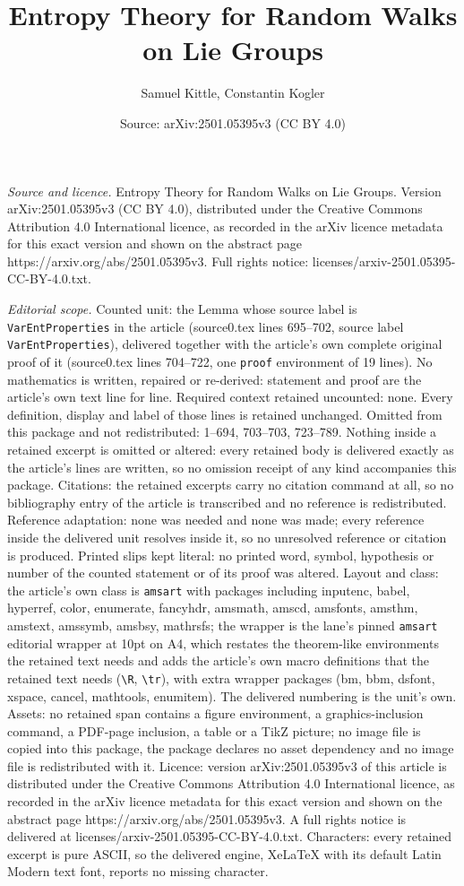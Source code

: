 \documentclass[10pt,a4paper]{amsart}
\title[Entropy Theory for Random Walks on Lie Groups]{Entropy Theory for Random Walks on Lie Groups}
\author{Samuel Kittle, Constantin Kogler}
\date{Source: arXiv:2501.05395v3 (CC BY 4.0)}
\begin{document}
\maketitle

\noindent\emph{Source and licence.} Entropy Theory for Random Walks on Lie Groups. Version arXiv:2501.05395v3 (CC BY 4.0), distributed under the Creative Commons Attribution 4.0 International licence, as recorded in the arXiv licence metadata for this exact version and shown on the abstract page https://arxiv.org/abs/2501.05395v3. Full rights notice: licenses/arxiv-2501.05395-CC-BY-4.0.txt.\par\smallskip

\noindent\textit{Editorial scope.} Counted unit: the Lemma whose source label is \texttt{VarEntProperties} in the article (source0.tex lines 695--702, source label \texttt{VarEntProperties}), delivered together with the article's own complete original proof of it (source0.tex lines 704--722, one \texttt{proof} environment of 19 lines). No mathematics is written, repaired or re-derived: statement and proof are the article's own text line for line. Required context retained uncounted: none. Every definition, display and label of those lines is retained unchanged. Omitted from this package and not redistributed: 1--694, 703--703, 723--789. Nothing inside a retained excerpt is omitted or altered: every retained body is delivered exactly as the article's lines are written, so no omission receipt of any kind accompanies this package. Citations: the retained excerpts carry no citation command at all, so no bibliography entry of the article is transcribed and no reference is redistributed. Reference adaptation: none was needed and none was made; every reference inside the delivered unit resolves inside it, so no unresolved reference or citation is produced. Printed slips kept literal: no printed word, symbol, hypothesis or number of the counted statement or of its proof was altered. Layout and class: the article's own class is \texttt{amsart} with packages including inputenc, babel, hyperref, color, enumerate, fancyhdr, amsmath, amscd, amsfonts, amsthm, amstext, amssymb, amsbsy, mathrsfs; the wrapper is the lane's pinned \texttt{amsart} editorial wrapper at 10pt on A4, which restates the theorem-like environments the retained text needs and adds the article's own macro definitions that the retained text needs (\texttt{\textbackslash R}, \texttt{\textbackslash tr}), with extra wrapper packages (bm, bbm, dsfont, xspace, cancel, mathtools, enumitem). The delivered numbering is the unit's own. Assets: no retained span contains a figure environment, a graphics-inclusion command, a PDF-page inclusion, a table or a TikZ picture; no image file is copied into this package, the package declares no asset dependency and no image file is redistributed with it. Licence: version arXiv:2501.05395v3 of this article is distributed under the Creative Commons Attribution 4.0 International licence, as recorded in the arXiv licence metadata for this exact version and shown on the abstract page https://arxiv.org/abs/2501.05395v3. A full rights notice is delivered at licenses/arxiv-2501.05395-CC-BY-4.0.txt. Characters: every retained excerpt is pure ASCII, so the delivered engine, XeLaTeX with its default Latin Modern text font, reports no missing character.
\end{document}
